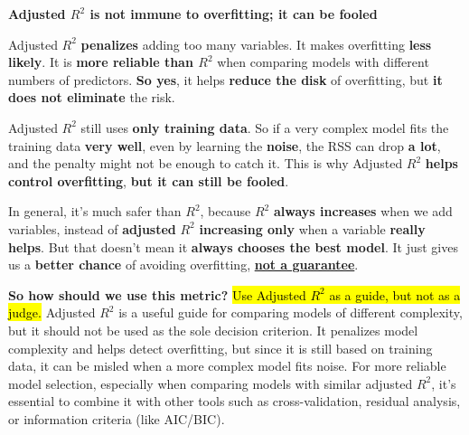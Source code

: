\highspace
\begin{flushleft}
    \textcolor{Red2}{ \textbf{Adjusted $R^2$ is not immune to overfitting; it can be fooled}}
\end{flushleft}
Adjusted $R^2$ \textbf{penalizes} adding too many variables. It makes overfitting \textbf{less likely}. It is \textbf{more reliable than $R^2$} when comparing models with different numbers of predictors. \textbf{So yes}, it helps \textbf{reduce the disk} of overfitting, but \textbf{it does not eliminate} the risk.

\highspace
Adjusted $R^2$ still uses \textbf{only training data}. So if a very complex model fits the training data \textbf{very well}, even by learning the \textbf{noise}, the RSS can drop \textbf{a lot}, and the penalty might not be enough to catch it. This is why Adjusted $R^2$ \textbf{helps control overfitting}, \textbf{but it can still be fooled}.

\highspace
In general, it's much safer than $R^2$, because $R^2$ \textbf{always increases} when we add variables, instead of \textbf{adjusted} $R^2$ \textbf{increasing only} when a variable \textbf{really helps}. But that doesn't mean it \textbf{always chooses the best model}. It just gives us a \textbf{better chance} of avoiding overfitting, \underline{\textbf{not a guarantee}}.

\highspace
\textcolor{Green3}{ \textbf{So how should we use this metric?}} \hl{Use Adjusted $R^2$ as a guide, but not as a judge.} Adjusted $R^2$ is a useful guide for comparing models of different complexity, but it should not be used as the sole decision criterion. It penalizes model complexity and helps detect overfitting, but since it is still based on training data, it can be misled when a more complex model fits noise. For more reliable model selection, especially when comparing models with similar adjusted $R^2$, it's essential to combine it with other tools such as cross-validation, residual analysis, or information criteria (like AIC/BIC).


